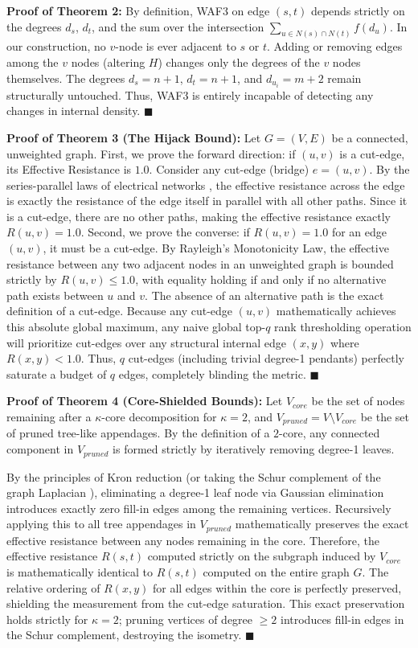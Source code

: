 \documentclass[10pt]{article} %
\begin{document}
\textbf{Proof of Theorem 2:} By definition, WAF3 on edge $(s,t)$ depends strictly on the degrees $d_s$, $d_t$, and the sum over the intersection $\sum_{u \in N(s) \cap N(t)} f(d_u)$. In our construction, no $v$-node is ever adjacent to $s$ or $t$. Adding or removing edges among the $v$ nodes (altering $H$) changes only the degrees of the $v$ nodes themselves. The degrees $d_s = n+1$, $d_t = n+1$, and $d_{u_i} = m+2$ remain structurally untouched. Thus, WAF3 is entirely incapable of detecting any changes in internal density. $\blacksquare$

\textbf{Proof of Theorem 3 (The Hijack Bound):} Let $G = (V,E)$ be a connected, unweighted graph. 
First, we prove the forward direction: if $(u,v)$ is a cut-edge, its Effective Resistance is $1.0$. Consider any cut-edge (bridge) $e = (u, v)$. By the series-parallel laws of electrical networks \citep{Doyle1984}, the effective resistance across the edge is exactly the resistance of the edge itself in parallel with all other paths. Since it is a cut-edge, there are no other paths, making the effective resistance exactly $R(u,v) = 1.0$.
Second, we prove the converse: if $R(u,v) = 1.0$ for an edge $(u,v)$, it must be a cut-edge. By Rayleigh's Monotonicity Law, the effective resistance between any two adjacent nodes in an unweighted graph is bounded strictly by $R(u,v) \le 1.0$, with equality holding if and only if no alternative path exists between $u$ and $v$. The absence of an alternative path is the exact definition of a cut-edge.
Because any cut-edge $(u, v)$ mathematically achieves this absolute global maximum, any naive global top-$q$ rank thresholding operation will prioritize cut-edges over any structural internal edge $(x,y)$ where $R(x,y) < 1.0$. Thus, $q$ cut-edges (including trivial degree-1 pendants) perfectly saturate a budget of $q$ edges, completely blinding the metric. $\blacksquare$

\textbf{Proof of Theorem 4 (Core-Shielded Bounds):} Let $V_{core}$ be the set of nodes remaining after a $\kappa$-core decomposition for $\kappa = 2$, and $V_{pruned} = V \setminus V_{core}$ be the set of pruned tree-like appendages. By the definition of a $2$-core, any connected component in $V_{pruned}$ is formed strictly by iteratively removing degree-1 leaves.

By the principles of Kron reduction (or taking the Schur complement of the graph Laplacian \citep{Dorfler2013}), eliminating a degree-1 leaf node via Gaussian elimination introduces exactly zero fill-in edges among the remaining vertices. Recursively applying this to all tree appendages in $V_{pruned}$ mathematically preserves the exact effective resistance between any nodes remaining in the core. Therefore, the effective resistance $R(s,t)$ computed strictly on the subgraph induced by $V_{core}$ is mathematically identical to $R(s,t)$ computed on the entire graph $G$. The relative ordering of $R(x,y)$ for all edges within the core is perfectly preserved, shielding the measurement from the cut-edge saturation. This exact preservation holds strictly for $\kappa=2$; pruning vertices of degree $\ge 2$ introduces fill-in edges in the Schur complement, destroying the isometry. $\blacksquare$
\end{document}
